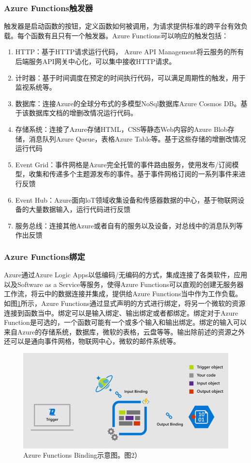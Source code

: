 \subsubsection{Azure Functions触发器}
触发器是启动函数的按钮，定义函数如何被调用，为请求提供标准的跨平台有效负载。每个函数有且只有一个触发器。Azure Functions可以响应的触发包括：
\begin{enumerate}
	\item HTTP：基于HTTP请求运行代码， Azure API Management将云服务的所有后端服务API网关中心化，可以集中接收HTTP请求。
	\item 计时器：基于时间调度在预定的时间执行代码，可以满足周期性的触发，用于监视系统等。
	\item 数据库：连接Azure的全球分布式的多模型NoSql数据库Azure Cosmos DB。基于该数据库文档的增删改情况运行代码。
	\item 存储系统：连接了Azure存储HTML，CSS等静态Web内容的Azure Blob存储，消息队列Azure Queue，表格Azure Table等。基于这些存储的增删改情况运行代码
	\item Event Grid：事件网格是Azure完全托管的事件路由服务，使用发布/订阅模型，收集和传递多个主题源发布的事件。基于事件网格订阅的一系列事件来进行反馈
	\item Event Hub：Azure面向loT领域收集设备和传感器数据的中心，基于物联网设备的大量数据输入，运行代码进行反馈
	\item 服务总线：连接其他Azure或者自有的服务以及设备，对总线中的消息队列等作出反馈
\end{enumerate}
\subsubsection{Azure Functions绑定}
Azure通过Azure Logic Apps以低编码/无编码的方式，集成连接了各类软件，应用以及Software as a Service等服务，使得Azure Functions可以直观的创建无服务器工作流，将云中的数据连接并集成，提供给Azure Functions当中作为工作负载。如图\ref{figs:bind}所示，Azure Functions通过显式声明的方式进行绑定，将另一个微软的资源连接到函数当中。绑定可以是输入绑定、输出绑定或者都绑定。绑定对于Azure Function是可选的，一个函数可能有一个或多个输入和输出绑定。绑定的输入可以来自Azure的存储系统，数据库，微软的表格，云盘等等。输出除前述的资源之外还可以是通向事件网格，物联网中心，微软的邮件系统等。
\begin{figure}[!htbp]
	\centering
	\includegraphics[width=0.6\linewidth]{figs/AzureBindings.png}
	\caption{Azure Functions Binding示意图。\cite{binding}图2）}
	\label{figs:bind}
\end{figure}

